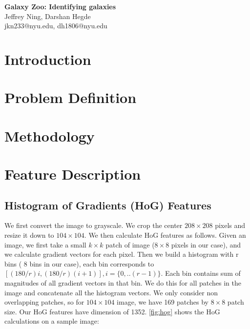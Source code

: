 \documentclass[10pt]{article}
\date{05/16/2014}
\begin{document}
\begin{flushleft}
{\Large
\textbf{Galaxy Zoo: Identifying galaxies}
}
\\
Jeffrey Ning, 
Darshan Hegde 
\\
jkn233@nyu.edu, dh1806@nyu.edu
\end{flushleft}

\section*{Introduction}


\section*{Problem Definition}

\section*{Methodology}

\section*{Feature Description}

\subsection*{Histogram of Gradients (HoG) Features}
We first convert the image to grayscale. We crop the center $ 208 \times 208 $ pixels and resize it down to $104 \times 104$. We then calculate HoG features as follows. Given an image, we first take a small $k \times k$ patch of image ($8 \times 8$ pixels in our case), and we calculate gradient vectors for each pixel. Then we build a histogram with r bins ( 8 bins in our case), each bin corresponds to ${[(180/r)i, (180/r)(i+1)]} , i=\{0, .. (r-1)\}$. Each bin contains sum of magnitudes of all gradient vectors in that bin. We do this for all patches in the image and concatenate all the histogram vectors. We only consider non overlapping patches, so for $104 \times 104$ image, we have 169 patches by $8 \times 8$ patch size. Our HoG features have dimension of 1352. \ref{fig:hog} shows the HoG calculations on a sample image: 
\end{document}
